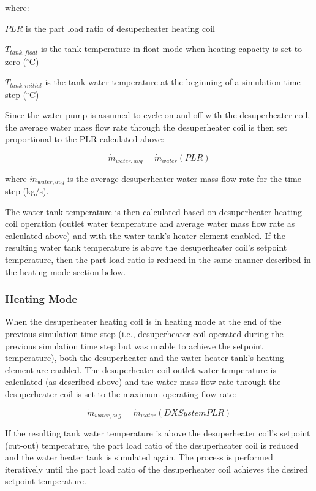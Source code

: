 where:

\(PLR\) is the part load ratio of desuperheater heating coil

\({T_{tank,float}}\) is the tank temperature in float mode when heating capacity is set to zero (\(^{\circ}\)C)

\({T_{tank,initial}}\) is the tank water temperature at the beginning of a simulation time step (\(^{\circ}\)C)

Since the water pump is assumed to cycle on and off with the desuperheater coil, the average water mass flow rate through the desuperheater coil is then set proportional to the PLR calculated above:

\begin{equation}
\dot{m}_{water,avg} = \dot{m}_{water}\left( {PLR} \right)
\end{equation}

where \(\dot{m}_{water,avg}\) is the average desuperheater water mass flow rate for the time step (kg/s).

The water tank temperature is then calculated based on desuperheater heating coil operation (outlet water temperature and average water mass flow rate as calculated above) and with the water tank's heater element enabled. If the resulting water tank temperature is above the desuperheater coil's setpoint temperature, then the part-load ratio is reduced in the same manner described in the heating mode section below.

\subsubsection{Heating Mode}\label{heating-mode}

When the desuperheater heating coil is in heating mode at the end of the previous simulation time step (i.e., desuperheater coil operated during the previous simulation time step but was unable to achieve the setpoint temperature), both the desuperheater and the water heater tank's heating element are enabled. The desuperheater coil outlet water temperature is calculated (as described above) and the water mass flow rate through the desuperheater coil is set to the maximum operating flow rate:

\begin{equation}
\dot{m}_{water,avg} = \dot{m}_{water} \left( {DXSystemPLR} \right)
\end{equation}

If the resulting tank water temperature is above the desuperheater coil's setpoint (cut-out) temperature, the part load ratio of the desuperheater coil is reduced and the water heater tank is simulated again. The process is performed iteratively until the part load ratio of the desuperheater coil achieves the desired setpoint temperature.

